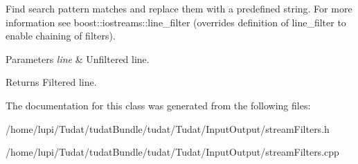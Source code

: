 Find search pattern matches and replace them with a predefined string. For more information see boost\+::iostreams\+::line\+\_\+filter (overrides definition of line\+\_\+filter to enable chaining of filters). 
\begin{DoxyParams}{Parameters}
{\em line} & Unfiltered line. \\
\hline
\end{DoxyParams}
\begin{DoxyReturn}{Returns}
Filtered line. 
\end{DoxyReturn}


The documentation for this class was generated from the following files\+:\begin{DoxyCompactItemize}
\item 
/home/lupi/\+Tudat/tudat\+Bundle/tudat/\+Tudat/\+Input\+Output/stream\+Filters.\+h\item 
/home/lupi/\+Tudat/tudat\+Bundle/tudat/\+Tudat/\+Input\+Output/stream\+Filters.\+cpp\end{DoxyCompactItemize}
